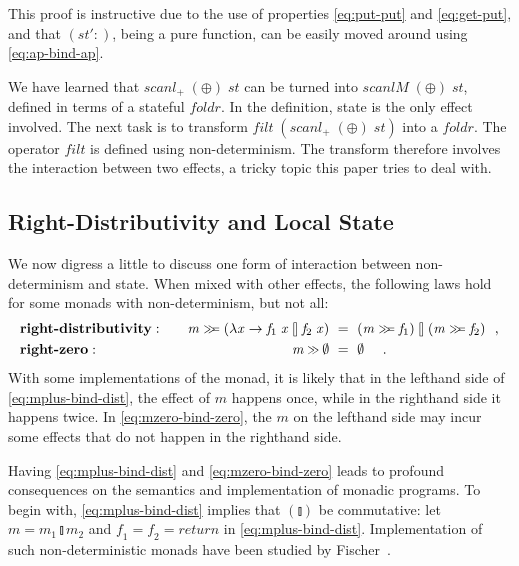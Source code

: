 \documentclass{llncs}
\newcommand{\Varid}[1]{\mathit{#1}}
\let\Varid\mathit
\begin{document}
This proof is instructive due to the use of properties \eqref{eq:put-put} and \eqref{eq:get-put}, and that \ensuremath{(\Varid{st'}\mathbin{:})}, being a pure function, can be easily moved around using \eqref{eq:ap-bind-ap}.

We have learned that \ensuremath{\Varid{scanl}_{+}\;(\oplus)\;\Varid{st}} can be turned into \ensuremath{\Varid{scanlM}\;(\oplus)\;\Varid{st}}, defined in terms of a stateful \ensuremath{\Varid{foldr}}.
In the definition, state is the only effect involved.
The next task is to transform \ensuremath{\Varid{filt}\;(\Varid{scanl}_{+}\;(\oplus)\;\Varid{st})} into a \ensuremath{\Varid{foldr}}.
The operator \ensuremath{\Varid{filt}} is defined using non-determinism. The transform therefore involves the interaction between two effects, a tricky topic this paper tries to deal with.

\subsection{Right-Distributivity and Local State}
\label{sec:right-distr-local-state}

We now digress a little to discuss one form of interaction between non-determinism and state.
When mixed with other effects, the following laws hold for some monads with non-determinism, but not all:
\begin{alignat}{2}
&\mbox{\bf right-distributivity}:\quad&
  \ensuremath{\Varid{m}\mathrel{\hstretch{0.7}{>\!\!>\!\!=}}(\lambda \Varid{x}\to \Varid{f}_{1}\;\Varid{x}\mathbin{\talloblong}\Varid{f}_{2}\;\Varid{x})}~ &=~ \ensuremath{(\Varid{m}\mathrel{\hstretch{0.7}{>\!\!>\!\!=}}\Varid{f}_{1})\mathbin{\talloblong}(\Varid{m}\mathrel{\hstretch{0.7}{>\!\!>\!\!=}}\Varid{f}_{2})} \mbox{~~,}
    \label{eq:mplus-bind-dist}\\
&\mbox{\bf right-zero}:\quad&
  \ensuremath{\Varid{m}\mathbin{\hstretch{0.7}{>\!\!>}}\emptyset}~ &=~ \ensuremath{\emptyset} ~~\mbox{~~.}
    \label{eq:mzero-bind-zero}
\end{alignat}
With some implementations of the monad, it is likely that in the lefthand side of \eqref{eq:mplus-bind-dist}, the effect of \ensuremath{\Varid{m}} happens once, while in the righthand side it happens twice. In \eqref{eq:mzero-bind-zero}, the \ensuremath{\Varid{m}} on the lefthand side may incur some effects that do not happen in the righthand side.

Having \eqref{eq:mplus-bind-dist} and \eqref{eq:mzero-bind-zero} leads to profound consequences on the semantics and implementation of monadic programs.
To begin with, \eqref{eq:mplus-bind-dist} implies that \ensuremath{(\talloblong)} be commutative: let \ensuremath{\Varid{m}\mathrel{=}\Varid{m}_{1}\mathbin{\talloblong}\Varid{m}_{2}} and \ensuremath{\Varid{f}_{1}\mathrel{=}\Varid{f}_{2}\mathrel{=}\Varid{return}} in \eqref{eq:mplus-bind-dist}.
Implementation of such non-deterministic monads have been studied by Fischer~\cite{Fischer:11:Purely}.
\end{document}
